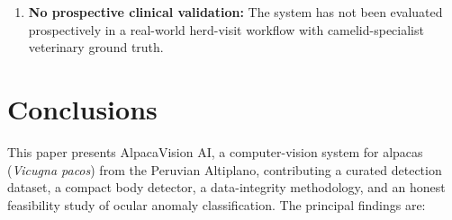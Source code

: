 \documentclass[journal=animals,article=article,submit=mdpi,moreauthors=true,pdftex]{mdpi}
\begin{document}
\begin{enumerate}
        may under-represent the marked phenotypic variation among alpaca breeds --- notably
        the dense, crimped fleece of the \textit{Huacaya} versus the long, lustrous locks of
        the \textit{Suri} --- and across coat colours; such differences in body outline and
        surface texture could reduce detector recall under large-scale field deployment.
        Domain adaptation across breeds, coat types, and high-altitude Andean imaging
        conditions is ongoing.
  \item \textbf{No prospective clinical validation:}
        The system has not been evaluated prospectively in a real-world herd-visit
        workflow with camelid-specialist veterinary ground truth.
\end{enumerate}

\section{Conclusions}
\label{sec:conclusions}

This paper presents AlpacaVision AI, a computer-vision system for alpacas
(\textit{Vicugna pacos}) from the Peruvian Altiplano, contributing a curated detection
dataset, a compact body detector, a data-integrity methodology, and an honest feasibility
study of ocular anomaly classification.
The principal findings are:
\end{document}
